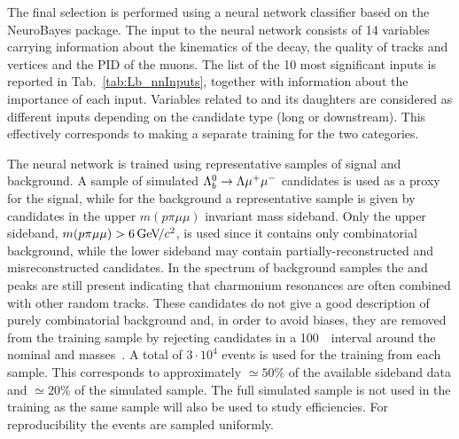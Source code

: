 The final selection is performed using a neural network classifier based on the NeuroBayes package.
 The input to the neural network consists of 14 variables carrying 
information about the kinematics of the decay, the quality of tracks and vertices and the PID of the muons.
The list of the 10 most significant inputs is reported in Tab.~\ref{tab:Lb_nnInputs}, together with information 
about the importance of each input.
%
%
%
Variables related to \Lz and its daughters are considered as different inputs depending on the
candidate type (long or downstream). This effectively corresponds to making a separate
training for the two categories. 

The neural network is trained using representative samples of signal and background.  A sample of simulated 
${{\Lambda}^0_{b}}\rightarrow{\ensuremath{\Lambda}}{\ensuremath{\mu^+\mu^-}}$ candidates is used as a proxy for the signal, while for the background a representative sample
is given by candidates in the upper $m(p\pi\mu\mu)$ invariant mass sideband. Only the upper sideband,
$m(p\pi\mu\mu) > 6 \gevcc$, is used since it contains only combinatorial background,
while the lower sideband may contain partially-reconstructed and misreconstructed candidates.
In the \qsq spectrum of background samples the \jpsi and \psitwos peaks are still present indicating that charmonium
resonances are often combined with other random tracks. These candidates do not give a good description of purely
combinatorial background and, in order to avoid biases, they are removed from the training
sample by rejecting candidates in a 100~\mevcc~interval around the nominal \jpsi and \psitwos masses~\cite{PDG2014}.
A total of $3\cdot10^4$ events is used for the training from each sample. This corresponds to approximately
$\simeq 50\%$ of the available sideband data and $\simeq 20\%$ of the simulated sample. The full simulated sample 
is not used in the training as the same sample will also be used to study efficiencies. For reproducibility 
the events are sampled uniformly.

